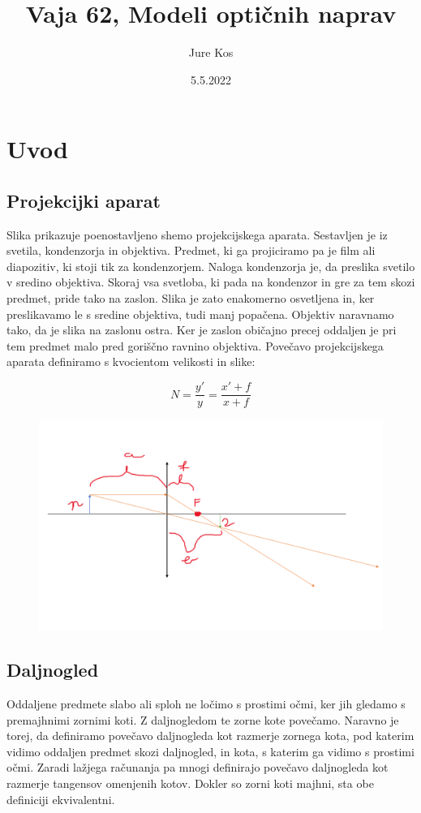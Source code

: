\documentclass[a4paper]{report}
\author{Jure Kos}
\title{Vaja 62, Modeli optičnih naprav}
\date{5.5.2022}
\begin{document}
\maketitle

\chapter*{Uvod}
\section*{Projekcijki aparat}
Slika prikazuje poenostavljeno shemo projekcijskega aparata. Sestavljen je iz svetila, kondenzorja in objektiva. Predmet, ki ga projiciramo pa je film ali diapozitiv, ki stoji tik za kondenzorjem. Naloga kondenzorja je, da preslika svetilo v sredino objektiva. Skoraj vsa svetloba, ki pada na kondenzor in gre za tem skozi predmet, pride tako na zaslon. Slika je zato enakomerno osvetljena in, ker preslikavamo le s sredine objektiva, tudi manj popačena. Objektiv naravnamo tako, da je slika na zaslonu ostra. Ker je zaslon običajno precej oddaljen je pri tem predmet malo pred goriščno ravnino objektiva. Povečavo projekcijskega aparata definiramo s kvocientom velikosti in slike:

\[N=\frac{y'}{y}=\frac{x'+f}{x+f}\]

\begin{figure}[htp]
    \centering
    \includegraphics[width=\textwidth]{Projektor.png}

\end{figure}

\section*{Daljnogled}
Oddaljene predmete slabo ali sploh ne ločimo s prostimi očmi, ker jih gledamo s premajhnimi zornimi koti. Z daljnogledom te zorne kote povečamo. Naravno je torej, da definiramo povečavo daljnogleda kot razmerje zornega kota, pod katerim vidimo oddaljen predmet skozi daljnogled, in kota, s katerim ga vidimo s prostimi očmi. Zaradi lažjega računanja pa mnogi definirajo povečavo daljnogleda kot razmerje tangensov omenjenih kotov. Dokler so zorni
koti majhni, sta obe definiciji ekvivalentni.
\end{document}
